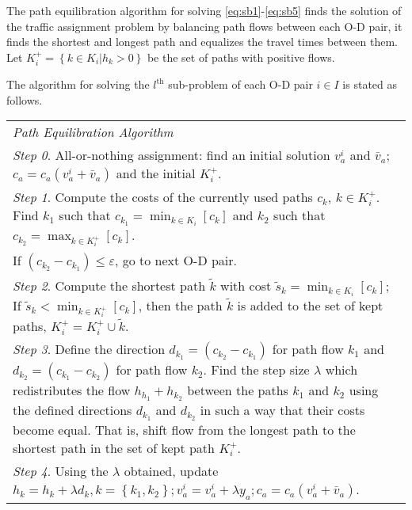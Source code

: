 The path equilibration algorithm for solving \eqref{eq:sb1}-\eqref{eq:sb5} 
finds the solution of the traffic assignment problem by balancing path flows between each O-D pair,
it finds the shortest and longest path and equalizes the travel times between them.
Let $K_i^{+} = \left\{ k \in K_i | h_k > 0 \right\}$ be the set of paths with positive flows.

The algorithm for solving the $l^\text{th}$ sub-problem of each O-D pair $i \in I$ is stated as follows.
\begin{table}[H]
    \begin{tabular}{ m{} }
        \hspace{-.5cm}\emph{Path Equilibration Algorithm} \citep{Florian} \\
        \emph{Step 0}. All-or-nothing assignment: find an initial solution $v_a^i$ and $\bar{v}_a$; $c_a = c_a(v_a^i+\bar{v}_a)$ and the initial $K_i^+$.\\
        \emph{Step 1}. Compute the costs of the currently used paths $c_k$, $k \in K_i^+$. Find $k_1$ such that $c_{k_1} = \displaystyle \min_{k \in K_i} \left[ c_k \right]$ and $k_2$ such that $c_{k_2} = \displaystyle \max_{k \in K_i^+} \left[c_k \right]$.\\
        If $(c_{k_2} - c_{k_1}) \leq \varepsilon$, go to next O-D pair.\\
        \emph{Step 2}. 
        Compute the shortest path $\tilde{k}$ with cost $\tilde{s}_k = \displaystyle \min_{k \in K_i} \left[ c_k \right]$;
        If $\tilde{s}_k < \displaystyle \min_{k \in K_i^+} \left[ c_k \right]$, then the path $\tilde{k}$ is added to the set of kept paths, $K_i^+ = K_i^+ \cup \tilde{k}$.\\
        \emph{Step 3}.  Define the direction $d_{k_1} = (c_{k_2} - c_{k_1})$ for path flow $k_1$ and $d_{k_2} = (c_{k_1} - c_{k_2})$ for path flow $k_2$.
         Find the step size $\lambda$ which redistributes the flow $h_{h_1} + h_{k_2}$ between the paths $k_1$ and $k_2$ using the defined directions $d_{k_1}$ and $d_{k_2}$ in such a way that their costs become equal. That is, shift flow from the longest path to the shortest path in the set of kept path $K_i^+$. \\
        \emph{Step 4}. Using the $\lambda$ obtained, update $h_k = h_k + \lambda d_k, k = \left\{ k_1, k_2 \right\}; v_a^i = v_a^i + \lambda y_a; c_a = c_a(v_a^i + \bar{v}_a)$. \\
    \end{tabular}
\end{table}

